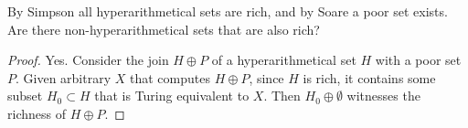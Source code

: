 \begin{question}
  By Simpson all hyperarithmetical sets are rich, and by Soare a
  poor set exists. Are there non-hyperarithmetical sets that are also
  rich?
\end{question}
\begin{proof}
  Yes. Consider the join $H\oplus P$ of a hyperarithmetical set $H$
  with a poor set $P$. Given arbitrary $X$ that computes $H\oplus P$,
  since $H$ is rich, it contains some subset $H_0\subset H$ that is
  Turing equivalent to $X$. Then $H_0\oplus\emptyset$ witnesses the
  richness of $H\oplus P$.
\end{proof}
